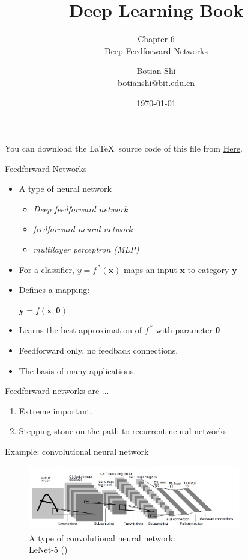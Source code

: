 \documentclass[10pt]{beamer}
\begin{document}
	\title{Deep Learning Book}
	\subtitle{Chapter 6 \\ Deep Feedforward Networks}
	\author{Botian Shi \\ botianshi@bit.edu.cn}
	\date{\today}

	\begin{frame}[plain]
		\titlepage
	\end{frame}

	\begin{frame}
		You can download the \LaTeX\, source code of this file from \href{https://github.com/friskit-china/DLBookSlides}{\underline{Here}}.
	\end{frame}
	
	\begin{frame}{Feedforward Networks}
		
		\begin{itemize}
			\item A type of neural network
				\begin{itemize}
					\item \emph{Deep feedforward network}
					\item \emph{feedforward neural network}
					\item \emph{multilayer perceptron (MLP)}
				\end{itemize}
			\item For a classifier, $y = f^{\,*}(\bm{x})$ maps an input $\bm{x}$ to category $\bm{y}$
			\item Defines a mapping:
					\begin{center}
						$\bm{y}=f(\bm{x};\bm{\theta})$
					\end{center}
			\item Learns the best approximation of $f^{\,*}$ with parameter $\bm{\theta}$
			\item Feedforward only, no feedback connections.
			\item The basis of many applications.
		\end{itemize}
	\end{frame}

	\begin{frame}{Feedforward networks are ...}
		\begin{enumerate}
			\item Extreme important.
			\item Stepping stone on the path to recurrent neural networks.
		\end{enumerate}
		\begin{exampleblock}{Example: convolutional neural network}
			\begin{figure}
				\includegraphics[width=25em]{figures/lenet-5.png}
				\caption{A type of convolutional neural network: \\ LeNet-5 (\citet{lecun1998gradient})}
			\end{figure}
		\end{exampleblock}
	\end{frame}
\end{document}
